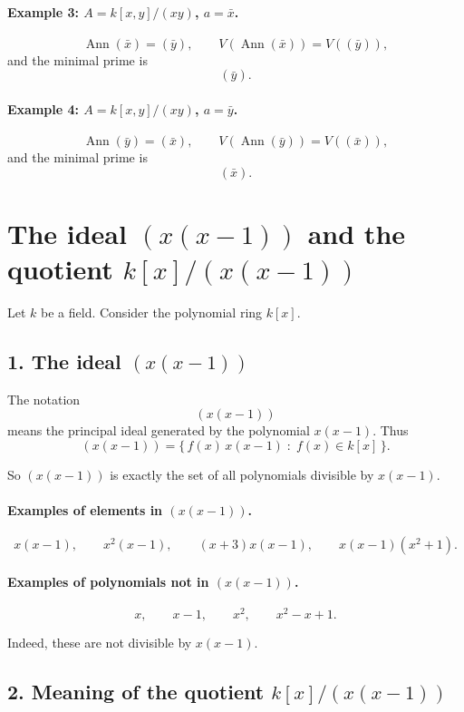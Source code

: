 \documentclass[12pt,a4paper]{article}
\theoremstyle{notespace}
\DeclareMathOperator{\Ann}{Ann}
\begin{document}
\paragraph{Example 3: \(A=k[x,y]/(xy)\), \(a=\bar x\).}
\[
\Ann(\bar x)=(\bar y), \qquad
V(\Ann(\bar x))=V((\bar y)),
\]
and the minimal prime is
\[
(\bar y).
\]

\paragraph{Example 4: \(A=k[x,y]/(xy)\), \(a=\bar y\).}
\[
\Ann(\bar y)=(\bar x), \qquad
V(\Ann(\bar y))=V((\bar x)),
\]
and the minimal prime is
\[
(\bar x).
\]	
	
\section*{The ideal \((x(x-1))\) and the quotient \(k[x]/(x(x-1))\)}

Let \(k\) be a field. Consider the polynomial ring \(k[x]\).

\subsection*{1. The ideal \((x(x-1))\)}

The notation
\[
(x(x-1))
\]
means the principal ideal generated by the polynomial \(x(x-1)\). Thus
\[
(x(x-1))
=
\{\,f(x)\,x(x-1)\;:\;f(x)\in k[x]\,\}.
\]

So \((x(x-1))\) is exactly the set of all polynomials divisible by \(x(x-1)\).

\paragraph{Examples of elements in \((x(x-1))\).}
\[
x(x-1),\qquad x^2(x-1),\qquad (x+3)x(x-1),\qquad x(x-1)(x^2+1).
\]

\paragraph{Examples of polynomials not in \((x(x-1))\).}
\[
x,\qquad x-1,\qquad x^2,\qquad x^2-x+1.
\]

Indeed, these are not divisible by \(x(x-1)\).

\subsection*{2. Meaning of the quotient \(k[x]/(x(x-1))\)}
\end{document}

